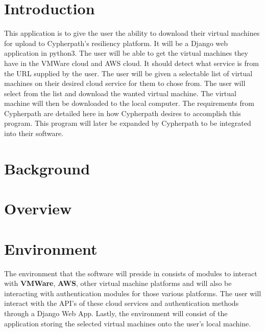 \documentclass{article}
\title{}
\author{}
\date{}
\begin{document}
    

    \tableofcontents
    \listoffigures

    \newpage
    \begin{versionhistory}
    \end{versionhistory}
    \newpage

    \section{Introduction}
    This application is to give the user the ability to download their virtual machines for upload to Cypherpath’s resiliency platform. It will be a Django web application in python3. The user will be able to get the virtual machines they have in the VMWare cloud and AWS cloud. It should detect what service is from the URL supplied by the user. The user will be given a selectable list of virtual machines on their desired cloud service for them to chose from. The user will select from the list and download the wanted virtual machine. The virtual machine will then be downloaded to the local computer. 
    The requirements from Cypherpath are detailed here in how Cypherpath desires to accomplish this program. This program will later be expanded by Cypherpath to be integrated into their software.     
    
    \section{Background}

    \section{Overview}

    \section{Environment}
    The environment that the software will preside in consists of modules to interact with \textbf{VMWare}, 
    \textbf{AWS}, other virtual machine platforms and will also be interacting with authentication modules for those
    various platforms. The user will interact with the API's of these cloud services and authentication
    methods through a Django Web App. Lastly, the environment will consist of the application storing the selected
    virtual machines onto the user's local machine.
\end{document}
